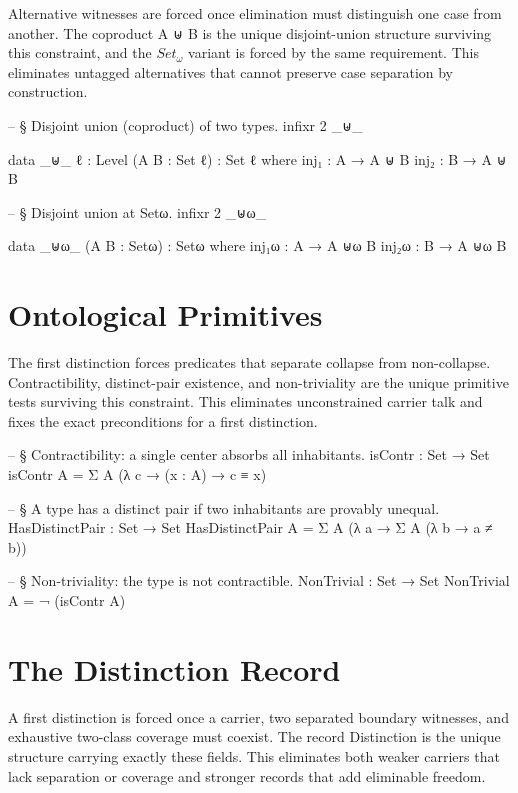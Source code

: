 \documentclass[11pt,a4paper]{book}
\def\texttt#1{#1}%
\begin{document}
Alternative witnesses are forced once elimination must distinguish one case from another.
The coproduct \texttt{A ⊎ B} is the unique disjoint-union structure surviving this constraint, and the $\mathit{Set}_\omega$ variant is forced by the same requirement.
This eliminates untagged alternatives that cannot preserve case separation by construction.

\begin{code}
-- § Disjoint union (coproduct) of two types.
infixr 2 _⊎_

data _⊎_ {ℓ : Level} (A B : Set ℓ) : Set ℓ where
  inj₁ : A → A ⊎ B
  inj₂ : B → A ⊎ B

-- § Disjoint union at Setω.
infixr 2 _⊎ω_

data _⊎ω_ (A B : Setω) : Setω where
  inj₁ω : A → A ⊎ω B
  inj₂ω : B → A ⊎ω B
\end{code}

\section{Ontological Primitives}

The first distinction forces predicates that separate collapse from non-collapse.
Contractibility, distinct-pair existence, and non-triviality are the unique primitive tests surviving this constraint.
This eliminates unconstrained carrier talk and fixes the exact preconditions for a first distinction.

\begin{code}
-- § Contractibility: a single center absorbs all inhabitants.
isContr : Set → Set
isContr A = Σ A (λ c → (x : A) → c ≡ x)

-- § A type has a distinct pair if two inhabitants are provably unequal.
HasDistinctPair : Set → Set
HasDistinctPair A = Σ A (λ a → Σ A (λ b → a ≠ b))

-- § Non-triviality: the type is not contractible.
NonTrivial : Set → Set
NonTrivial A = ¬ (isContr A)
\end{code}

\section{The Distinction Record}

A first distinction is forced once a carrier, two separated boundary witnesses, and exhaustive two-class coverage must coexist.
The record \texttt{Distinction} is the unique structure carrying exactly these fields.
This eliminates both weaker carriers that lack separation or coverage and stronger records that add eliminable freedom.
\end{document}
